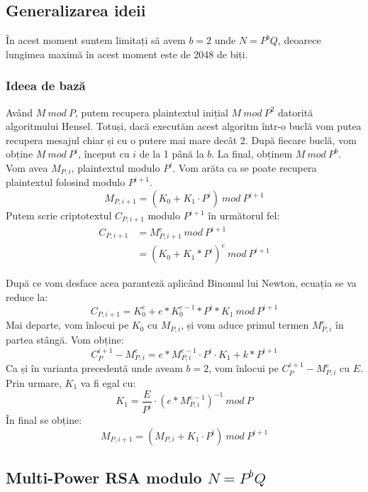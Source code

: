 \documentclass[12pt, oneside]{book}
\begin{document}
		  \subsection{Generalizarea ideii}
		  În acest moment suntem limitați să avem $b=2$ unde $N=P^bQ$, deoarece lungimea maximă în acest moment este de 2048 de biți.
		  \subsubsection{Ideea de bază}
		  Având $M \ mod \ P$, putem recupera plaintextul inițial $ M \ mod \ P^2$ datorită algoritmului Hensel. Totuși, dacă executăm acest algoritm într-o buclă vom putea recupera mesajul chiar și cu o putere mai mare decât 2. După fiecare buclă, vom obține $ M  \ mod \ P^i$, început cu $i$ de la 1 până la $b$. La final, obținem $M \ mod \ P^b$. Vom avea $M_{P,i}$, plaintextul modulo $P^i$. Vom arăta ca se poate recupera plaintextul folosind modulo $P^{i+1}.$
		  $$M_{P,i+1} = (K_0 +K_1 \cdot   P^i) \ mod \ P^{i+1}$$
		  Putem scrie criptotextul $C_{P,i+1}$ modulo $P^{i+1}$ în următorul fel:
		  \begin{align*}
		  C_{P,i+1} &= M_{P,i+1}^{e} \ mod \ P^{i+1}\\
		   &= (K_0+K_1*P^i)^e \ mod \ P^{i+1} 
		  \end{align*}
		  
		  După ce vom desface acea paranteză aplicând Binomul lui Newton, ecuația se va reduce la:
		  $$ C_{P,i+1} = K_{0}^{e} + e*K_{0}^{e-1} *P^i*K_1 \ mod \ P^{i+1}$$
		  Mai departe, vom înlocui pe $K_0$ cu $M_{P,i}$, și vom aduce primul termen $M_{P,i}^{e}$ în partea stângă. Vom obține:
		  $$C_{P}^{i+1} - M_{P,i}^{e} = e*M_{P,i}^{e-1} \cdot   P^i \cdot   K_1 + k *P^{i+1}$$
		  Ca și în varianta precedentă unde aveam $b=2$, vom înlocui pe $C_{P}^{i+1} - M_{P,i}^{e}$ cu $E$. Prin urmare, $K_1$ va fi egal cu:
		  $$K_1 = \frac{E}{P^i} \cdot   (e*M_{P,i}^{e-1})^{-1} \ mod \ P$$
		  În final se obține:
		  $$M_{P,i+1}= (M_{P,i} + K_1 \cdot   P^i) \ mod \ P^{i+1}$$
		  \subsection{Multi-Power RSA modulo $N=P^bQ$}
\end{document}
